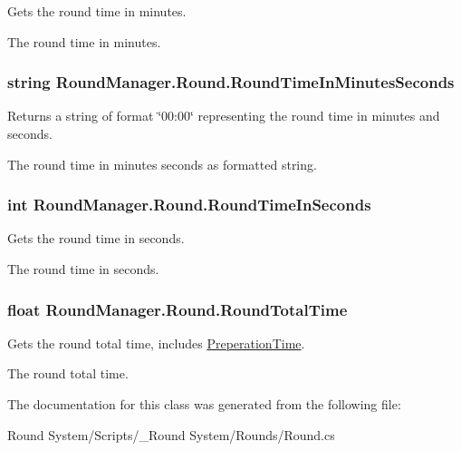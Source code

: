 Gets the round time in minutes. 

The round time in minutes.\hypertarget{class_round_manager_1_1_round_a04a73d6f8ba0ffb7191ae66723691cdd}{}
\subsubsection[{Round\+Time\+In\+Minutes\+Seconds}]{\setlength{\rightskip}{0pt plus 5cm}string Round\+Manager.\+Round.\+Round\+Time\+In\+Minutes\+Seconds\hspace{0.3cm}{\ttfamily [get]}}\label{class_round_manager_1_1_round_a04a73d6f8ba0ffb7191ae66723691cdd}


Returns a string of format \char`\"{}00\+:00\char`\"{} representing the round time in minutes and seconds. 

The round time in minutes seconds as formatted string.\hypertarget{class_round_manager_1_1_round_a58dc1defbee3968241a14102cd6804e7}{}
\subsubsection[{Round\+Time\+In\+Seconds}]{\setlength{\rightskip}{0pt plus 5cm}int Round\+Manager.\+Round.\+Round\+Time\+In\+Seconds\hspace{0.3cm}{\ttfamily [get]}}\label{class_round_manager_1_1_round_a58dc1defbee3968241a14102cd6804e7}


Gets the round time in seconds. 

The round time in seconds.\hypertarget{class_round_manager_1_1_round_acf43ece0f30f65cadc87fd0f0ce845ea}{}
\subsubsection[{Round\+Total\+Time}]{\setlength{\rightskip}{0pt plus 5cm}float Round\+Manager.\+Round.\+Round\+Total\+Time\hspace{0.3cm}{\ttfamily [get]}}\label{class_round_manager_1_1_round_acf43ece0f30f65cadc87fd0f0ce845ea}


Gets the round total time, includes \hyperlink{class_round_manager_1_1_round_a5a70ef04a60e0aeddaf1cd1898a419e5}{Preperation\+Time}. 

The round total time.

The documentation for this class was generated from the following file\+:\begin{DoxyCompactItemize}
\item 
Round System/\+Scripts/\+\_\+\+Round System/\+Rounds/Round.\+cs\end{DoxyCompactItemize}
